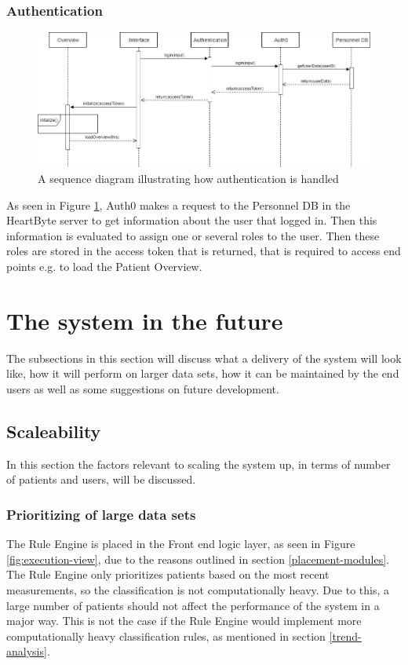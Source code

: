 \documentclass{article}
\begin{document}
\subsubsection{Authentication}
\begin{figure}[h]
    \centering
    \includegraphics[scale = 0.45]{auth-sequence}
    \caption{A sequence diagram illustrating how authentication is handled}
    \label{fig:auth-sequence}
\end{figure}

As seen in Figure \ref{fig:auth-sequence}, Auth0 makes a request to the Personnel DB in the HeartByte server to get information about the user that logged in. Then this information is evaluated to assign one or several roles to the user. Then these roles are stored in the access token that is returned, that is required to access end points e.g. to load the Patient Overview.

\clearpage
\section{The system in the future}
The subsections in this section will discuss what a delivery of the system will look like, how it will perform on larger data sets, how it can be maintained by the end users as well as some suggestions on future development.

\subsection{Scaleability}
In this section the factors relevant to scaling the system up, in terms of number of patients and users, will be discussed.

\subsubsection{Prioritizing of large data sets}
The Rule Engine is placed in the Front end logic layer, as seen in Figure \ref{fig:execution-view}, due to the reasons outlined in section \ref{placement-modules}. The Rule Engine only prioritizes patients based on the most recent measurements, so the classification is not computationally heavy. Due to this, a large number of patients should not affect the performance of the system in a major way. This is not the case if the Rule Engine would implement more computationally heavy classification rules, as mentioned in section \ref{trend-analysis}.
\end{document}
